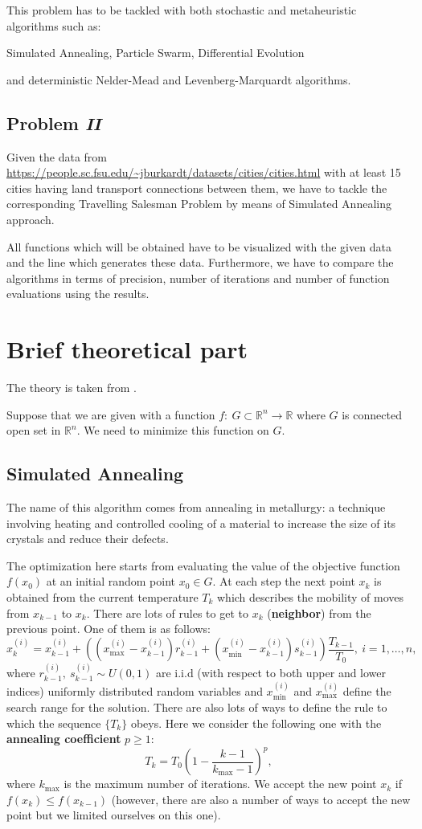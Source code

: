 \documentclass[12pt, bachelor, substylefile = algo_title.rtx]{disser}
\newcommand{\Real}{\mathbb{R}}
\theoremstyle{definition}
\begin{document}
This problem has to be tackled with both stochastic and metaheuristic algorithms such as:
\begin{outline}
\1 Simulated Annealing,
\1 Particle Swarm,
\1 Differential Evolution
\end{outline}
and deterministic Nelder-Mead and Levenberg-Marquardt algorithms.

\subsection{Problem \textit{II}}
Given the data from \url{https://people.sc.fsu.edu/~jburkardt/datasets/cities/cities.html} with at least 15 cities having land transport connections between them, we have to tackle the corresponding Travelling Salesman Problem by means of Simulated Annealing approach.

All functions which will be obtained have to be visualized with the given data and the line which generates these data. Furthermore, we have to compare the algorithms in terms of precision, number of iterations and number of function evaluations using the results.

\section{Brief theoretical part}
The theory is taken from \cite{cavazzuti13}.

Suppose that we are given with a function $f:\ G \subset \Real^n \to \Real$ where $G$ is connected open set in $\Real^n$. We need to minimize this function on $G$.

\subsection{Simulated Annealing}
The name of this algorithm comes from annealing in metallurgy: a technique involving heating and controlled cooling of a material to increase the size of its crystals and reduce their defects.

The optimization here starts from evaluating the value of the objective function $f(x_0)$
at an initial random point $x_0 \in G$. At each step the next point  $x_k$ is obtained from the current temperature $T_k$ which describes the mobility of moves from $x_{k-1}$ to $x_k$. There are lots of rules to get to $x_k$ (\textbf{neighbor}) from the previous point. One of them is as follows:
\[ x^{(i)}_{k} = x^{(i)}_{k-1} + \left((x^{(i)}_{\max} - x^{(i)}_{k-1})r^{(i)}_{k-1} + (x^{(i)}_{\min} - x^{(i)}_{k-1})s^{(i)}_{k-1}\right) \frac{T_{k-1}}{T_0},\ i = 1, \dots, n ,\]
where $r^{(i)}_{k-1},\ s^{(i)}_{k-1} \sim U(0, 1)$ are i.i.d (with respect to both upper and lower indices) uniformly distributed random variables and $x^{(i)}_{\min}$ and $x^{(i)}_{\max}$ define the search range for the solution. There are also lots of ways to define the rule to which the sequence $\{T_k\}$ obeys. Here we consider the following one with the \textbf{annealing coefficient} $p \ge 1$:
\[ T_k = T_0 \left(1 - \frac{k - 1}{k_{\max} - 1}\right)^p, \]
where $k_{\max}$ is the maximum number of iterations. We accept the new point $x_k$ if $f(x_k) \le f(x_{k-1})$ (however, there are also a number of ways to accept the new point but we limited ourselves on this one).
\end{document}
